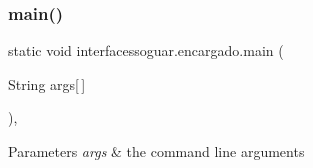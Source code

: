 \subsubsection{\texorpdfstring{main()}{main()}}
{\footnotesize\ttfamily static void interfacessoguar.\+encargado.\+main (\begin{DoxyParamCaption}\item[{String}]{args\mbox{[}$\,$\mbox{]} }\end{DoxyParamCaption})\hspace{0.3cm}{\ttfamily [inline]}, {\ttfamily [static]}}


\begin{DoxyParams}{Parameters}
{\em args} & the command line arguments \\
\hline
\end{DoxyParams}

